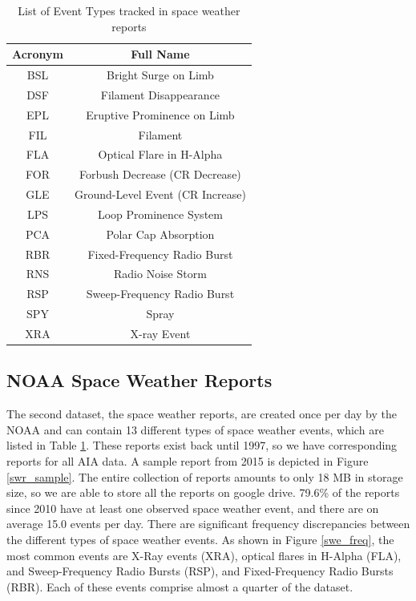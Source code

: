 \documentclass[12pt, letterpaper]{article}
\begin{document}
\begin{table}
\begin{center}
 \begin{tabular}{||c | c ||} 
 \hline
 Acronym & Full Name \\ [0.5ex] 
 \hline\hline
 BSL & Bright Surge on Limb \\
 \hline
 DSF & Filament Disappearance \\ 
 \hline
    EPL & Eruptive Prominence on Limb\\
 \hline
    FIL & Filament\\
 \hline
    FLA & Optical Flare in H-Alpha\\
 \hline
    FOR & Forbush Decrease (CR Decrease) \\
 \hline
    GLE & Ground-Level Event (CR Increase) \\
 \hline
    LPS & Loop Prominence System\\
 \hline
    PCA & Polar Cap Absorption\\
 \hline
    RBR & Fixed-Frequency Radio Burst\\
 \hline
    RNS & Radio Noise Storm\\
 \hline
    RSP & Sweep-Frequency Radio Burst\\
 \hline
    SPY & Spray\\
 \hline
    XRA & X-ray Event \\
 \hline
\end{tabular}
\caption{List of Event Types tracked in space weather reports}
\label{space_weather_events}
\end{center}
\end{table}

\subsection*{NOAA Space Weather Reports}

The second dataset, the space weather reports, are created once per day by the NOAA and can contain 13 different types of space weather events, which are listed in Table \ref{space_weather_events}. These reports exist back until 1997, so we have corresponding reports for all AIA data. A sample report from 2015 is depicted in Figure \ref{swr_sample}. The entire collection of reports amounts to only 18 MB in storage size, so we are able to store all the reports on google drive. 79.6\% of the reports since 2010 have at least one observed space weather event, and there are on average 15.0 events per day. There are significant frequency discrepancies between the different types of space weather events. As shown in Figure \ref{swe_freq}, the most common events are X-Ray events (XRA), optical flares in H-Alpha (FLA), and Sweep-Frequency Radio Bursts (RSP), and Fixed-Frequency Radio Bursts (RBR). Each of these events comprise almost a quarter of the dataset. 
\end{document}
